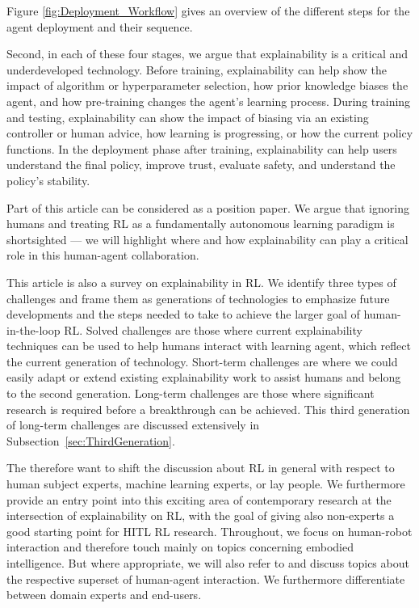 \documentclass[twoside,11pt]{article}
\begin{document}
Figure \ref{fig:Deployment_Workflow} gives an overview of the different steps for the agent deployment and their sequence.

Second, in each of these four stages, we argue that explainability is a critical and underdeveloped technology. Before training, explainability can help show the impact of algorithm or hyperparameter selection, how prior knowledge biases the agent, and how pre-training changes the agent's learning process. During training and testing, explainability can show the impact of biasing via an existing controller or human advice, how learning is progressing, or how the current policy functions. In the deployment phase after training, explainability can help users understand the final policy, improve trust, evaluate safety, and understand the policy's stability.

Part of this article can be considered as a position paper. We argue that ignoring humans and treating RL as a fundamentally autonomous learning paradigm is shortsighted --- we will highlight where and how explainability can play a critical role in this human-agent collaboration. 

This article is also a survey on explainability in RL. We identify three types of challenges and frame them as generations of technologies to emphasize future developments and the steps needed to take to achieve the larger goal of human-in-the-loop RL. Solved challenges are those where current explainability techniques can be used to help humans interact with learning agent, which reflect the current generation of technology. Short-term challenges are where we could easily adapt or extend existing explainability work to assist humans and belong to the second generation. Long-term challenges are those where significant research is required before a breakthrough can be achieved. This third generation of long-term challenges are discussed extensively in Subsection~\ref{sec:ThirdGeneration}.

The therefore want to shift the discussion about RL in general with respect to human subject experts, machine learning experts, or lay people. We furthermore provide an entry point into this exciting area of contemporary research at the intersection of explainability on RL, with the goal of giving also non-experts a good starting point for HITL RL research. Throughout, we focus on human-robot interaction and therefore touch mainly on topics concerning embodied intelligence. But where appropriate, we will also refer to and discuss topics about the respective superset of human-agent interaction. We furthermore differentiate between domain experts and end-users.
\end{document}
